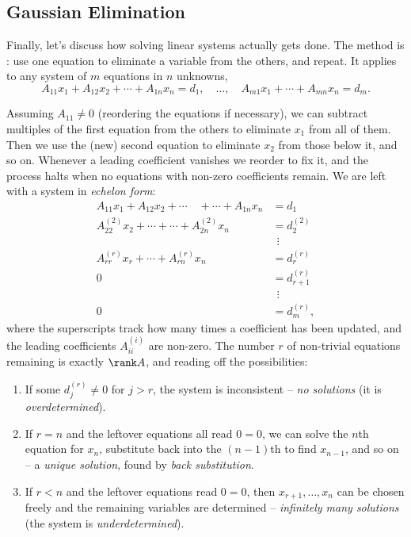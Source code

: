 \subsection{Gaussian Elimination}

Finally, let's discuss how solving linear systems actually gets done. The method is : use one equation to eliminate a variable from the others, and repeat. It applies to any system of $m$ equations in $n$ unknowns,
$$
A_{11}x_1 + A_{12}x_2 + \cdots + A_{1n}x_n = d_1, \quad \dots, \quad A_{m1}x_1 + \cdots + A_{mn}x_n = d_m.
$$

Assuming $A_{11} \neq 0$ (reordering the equations if necessary), we can subtract multiples of the first equation from the others to eliminate $x_1$ from all of them. Then we use the (new) second equation to eliminate $x_2$ from those below it, and so on. Whenever a leading coefficient vanishes we reorder to fix it, and the process halts when no equations with non-zero coefficients remain. We are left with a system in \emph{echelon form}:
\begin{align*}
	A_{11}x_1 + A_{12}x_2 + \cdots \quad + \cdots + A_{1n}x_n &= d_1 \\
	A^{(2)}_{22}x_2 + \cdots + \cdots + A^{(2)}_{2n}x_n &= d^{(2)}_2 \\
	&\ \ \vdots\\
	A^{(r)}_{rr}x_r + \cdots + A^{(r)}_{rn}x_n &= d^{(r)}_r \\
	0 &= d^{(r)}_{r + 1} \\
	&\ \ \vdots \\
	0 &= d^{(r)}_m,
\end{align*}
where the superscripts track how many times a coefficient has been updated, and the leading coefficients $A^{(i)}_{ii}$ are non-zero. The number $r$ of non-trivial equations remaining is exactly $\rank A$, and reading off the possibilities:
\begin{enumerate}[label=(\roman*)]
	\item If some $d^{(r)}_{j} \neq 0$ for $j > r$, the system is inconsistent -- \emph{no solutions} (it is \emph{overdetermined}).
	\item If $r = n$ and the leftover equations all read $0 = 0$, we can solve the $n$th equation for $x_n$, substitute back into the $(n-1)$th to find $x_{n - 1}$, and so on -- a \emph{unique solution}, found by \emph{back substitution}.
	\item If $r < n$ and the leftover equations read $0 = 0$, then $x_{r + 1}, \dots, x_n$ can be chosen freely and the remaining variables are determined -- \emph{infinitely many solutions} (the system is \emph{underdetermined}).
\end{enumerate}

